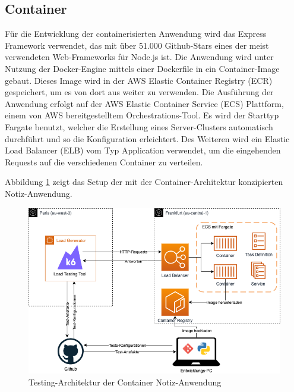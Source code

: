 \subsection{Container}
Für die Entwicklung der containerisierten Anwendung wird das Express Framework verwendet, das mit über 51.000 Github-Stars eines der meist verwendeten Web-Frameworks für Node.js ist. Die Anwendung wird unter Nutzung der Docker-Engine mittels einer Dockerfile in ein Container-Image gebaut. Dieses Image wird in der AWS Elastic Container Registry (ECR) gespeichert, um es von dort aus weiter zu verwenden. 
Die Ausführung der Anwendung erfolgt auf der AWS Elastic Container Service (ECS) Plattform, einem von AWS bereitgestelltem Orchestrations-Tool. Es wird der Starttyp Fargate benutzt, welcher die Erstellung eines Server-Clusters automatisch durchführt und so die Konfiguration erleichtert. Des Weiteren wird ein Elastic Load Balancer (ELB) vom Typ Application verwendet, um die eingehenden Requests auf die verschiedenen Container zu verteilen. 

Abbildung \ref{fig:fargate-testing-architektur} zeigt das Setup der mit der Container-Architektur konzipierten Notiz-Anwendung.

\begin{figure}[H]
    \includegraphics[width=\textwidth]{img/fargate-testing-architektur.png}
    \caption[Testing-Architektur der Container Notiz-Anwendung]{Testing-Architektur der Container Notiz-Anwendung}
    \label{fig:fargate-testing-architektur}
\end{figure}

